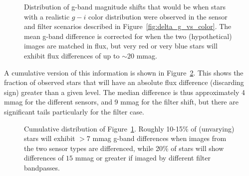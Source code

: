 \documentclass[DM,toc,lsstdraft]{lsstdoc}
\begin{document}
\begin{figure}
\caption{Distribution of g-band magnitude shifts that would be when stars with a
realistic $g-i$ color distribution were observed in the sensor and filter
scenarios described in Figure~\ref{fig:delta_g_vs_color}. The mean g-band
difference is corrected for when the two (hypothetical) images are matched in flux,
but very red or very blue stars will exhibit flux differences of up to $\sim 20$
mmag.
\label{fig:delta_g_histogram}}
\end{figure}

A cumulative version of this information is shown in
Figure~\ref{fig:delta_g_cumulative}. This shows the fraction of observed
stars that will have an absolute flux difference (discarding sign) greater than
a given level. The median difference is thus approximately 4 mmag for the
different sensors, and 9 mmag for the filter shift, but there are significant
tails particularly for the filter case.

\begin{figure}
\caption{Cumulative distribution of Figure~\ref{fig:delta_g_histogram}. Roughly
10-15\% of (unvarying) stars will exhibit $>7$ mmag g-band differences when
images from the two sensor types are differenced, while 20\% of stars will show
differences of $15$ mmag or greater if imaged by different filter bandpasses.
\label{fig:delta_g_cumulative}}
\end{figure}
\end{document}
